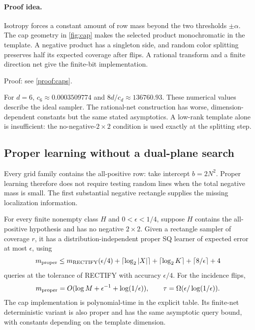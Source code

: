 \paragraph{Proof idea.}
Isotropy forces a constant amount of row mass beyond the two thresholds $\pm\alpha$. The cap geometry in \cref{fig:cap} makes the selected product monochromatic in the template. A negative product has a singleton side, and random color splitting preserves half its expected coverage after flips. A rational transform and a finite direction net give the finite-bit implementation.

\noindent Proof: see \cref{proof:caps}.\par


For $d=6$, $c_6\approx0.0003509774$ and $8d/c_d\approx136760.93$. These numerical values describe the ideal sampler. The rational-net construction has worse, dimension-dependent constants but the same stated asymptotics. A low-rank template alone is insufficient: the no-negative-$2\times2$ condition is used exactly at the splitting step.

\subsection{Proper learning without a dual-plane search}\label{sec:proper}
Every grid family contains the all-positive row: take intercept $b=2N^2$. Proper learning therefore does not require testing random lines when the total negative mass is small. The first substantial negative rectangle supplies the missing localization information.


\begin{theorem}\label{thm:proper}
For every finite nonempty class $H$ and $0<\epsilon<1/4$, suppose $H$ contains the all-positive hypothesis and has no negative $2\times2$. Given a rectangle sampler of coverage $r$, it has a distribution-independent proper SQ learner of expected error at most $\epsilon$, using
\begin{equation}\label{eq:propercomplexity}
 m_{\rm proper}\le m_{\rm RECTIFY}(\epsilon/4)
 +\lceil\log_2|X|\rceil+\lceil\log_2K\rceil
 +\lceil8/\epsilon\rceil+4
\end{equation}
queries at the tolerance of RECTIFY with accuracy $\epsilon/4$. For the incidence flips,
\[
 m_{\rm proper}=O(\log M+\epsilon^{-1}+\log(1/\epsilon)),\qquad
 \tau=\Omega(\epsilon/\log(1/\epsilon)).
\]
The cap implementation is polynomial-time in the explicit table. Its finite-net deterministic variant is also proper and has the same asymptotic query bound, with constants depending on the template dimension.
\end{theorem}


